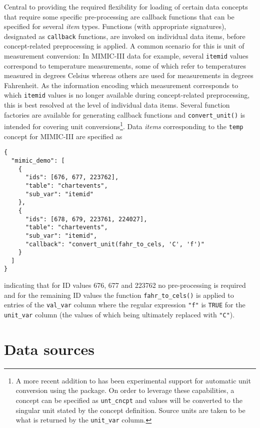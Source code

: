 \documentclass[
  notitle]{jss}
\begin{document}
Central to providing the required flexibility for loading of certain
data concepts that require some specific pre-processing are callback
functions that can be specified for several \emph{item} types. Functions
(with appropriate signatures), designated as \texttt{callback}
functions, are invoked on individual data items, before concept-related
preprocessing is applied. A common scenario for this is unit of
measurement conversion: In MIMIC-III data for example, several
\texttt{itemid} values correspond to temperature measurements, some of
which refer to temperatures measured in degrees Celsius whereas others
are used for measurements in degrees Fahrenheit. As the information
encoding which measurement corresponds to which \texttt{itemid} values
is no longer available during concept-related preprocessing, this is
best resolved at the level of individual data items. Several function
factories are available for generating callback functions and
\texttt{convert\_unit()} is intended for covering unit
conversions\footnote{A more recent addition to  has been
  experimental support for automatic unit conversion using the
   package\citep{pebesma2016}. On order to leverage these
  capabilities, a concept can be specified as \texttt{unt\_cncpt} and
  values will be converted to the singular unit stated by the concept
  definition. Source units are taken to be what is returned by the
  \texttt{unit\_var} column.}. Data \emph{items} corresponding to the
\texttt{temp} concept for MIMIC-III are specified as

\begin{verbatim}
{
  "mimic_demo": [
    {
      "ids": [676, 677, 223762],
      "table": "chartevents",
      "sub_var": "itemid"
    },
    {
      "ids": [678, 679, 223761, 224027],
      "table": "chartevents",
      "sub_var": "itemid",
      "callback": "convert_unit(fahr_to_cels, 'C', 'f')"
    }
  ]
}
\end{verbatim}

indicating that for ID values 676, 677 and 223762 no pre-processing is
required and for the remaining ID values the function
\texttt{fahr\_to\_cels()} is applied to entries of the \texttt{val\_var}
column where the regular expression \texttt{"f"} is \texttt{TRUE} for
the \texttt{unit\_var} column (the values of which being ultimately
replaced with \texttt{"C"}).

\hypertarget{data-sources}{%
\section{Data sources}\label{data-sources}}
\end{document}
